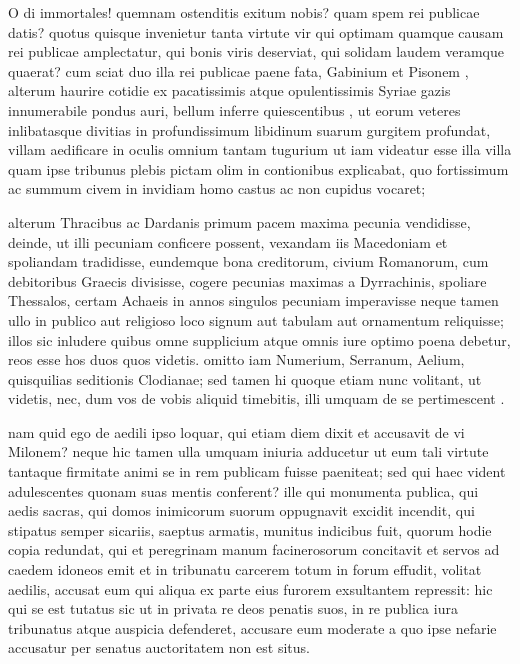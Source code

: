 O di immortales! quemnam ostenditis exitum nobis? quam spem rei publicae datis? quotus quisque invenietur tanta virtute vir qui optimam quamque causam rei publicae amplectatur, qui bonis viris deserviat, qui solidam laudem veramque quaerat? cum sciat duo illa rei publicae paene fata, Gabinium et Pisonem , alterum haurire cotidie ex pacatissimis atque opulentissimis Syriae gazis innumerabile pondus auri, bellum inferre quiescentibus , ut eorum veteres inlibatasque divitias in profundissimum libidinum suarum gurgitem profundat, villam aedificare in oculis omnium tantam tugurium ut iam videatur esse illa villa quam ipse tribunus plebis pictam olim in contionibus explicabat, quo fortissimum ac summum civem in invidiam homo castus ac non cupidus vocaret;

 alterum Thracibus ac Dardanis primum pacem maxima pecunia vendidisse, deinde, ut illi pecuniam conficere possent, vexandam iis Macedoniam et spoliandam tradidisse, eundemque bona creditorum, civium Romanorum, cum debitoribus Graecis divisisse, cogere pecunias maximas a Dyrrachinis, spoliare Thessalos, certam Achaeis in annos singulos pecuniam imperavisse neque tamen ullo in publico aut religioso loco signum aut tabulam aut ornamentum reliquisse; illos sic inludere quibus omne supplicium atque omnis iure optimo poena debetur, reos esse hos duos quos videtis. omitto iam Numerium, Serranum, Aelium, quisquilias seditionis Clodianae; sed tamen hi quoque etiam nunc volitant, ut videtis, nec, dum vos de vobis aliquid timebitis, illi umquam de se pertimescent .

 nam quid ego de aedili ipso loquar, qui etiam diem dixit et accusavit de vi Milonem? neque hic tamen ulla umquam iniuria adducetur ut eum tali virtute tantaque firmitate animi se in rem publicam fuisse paeniteat; sed qui haec vident adulescentes quonam suas mentis conferent? ille qui monumenta publica, qui aedis sacras, qui domos inimicorum suorum oppugnavit excidit incendit, qui stipatus semper sicariis, saeptus armatis, munitus indicibus fuit, quorum hodie copia redundat, qui et peregrinam manum facinerosorum concitavit et servos ad caedem idoneos emit et in tribunatu carcerem totum in forum effudit, volitat aedilis, accusat eum qui aliqua ex parte eius furorem exsultantem repressit: hic qui se est tutatus sic ut in privata re deos penatis suos, in re publica iura tribunatus atque auspicia defenderet, accusare eum moderate a quo ipse nefarie accusatur per senatus auctoritatem non est situs.

